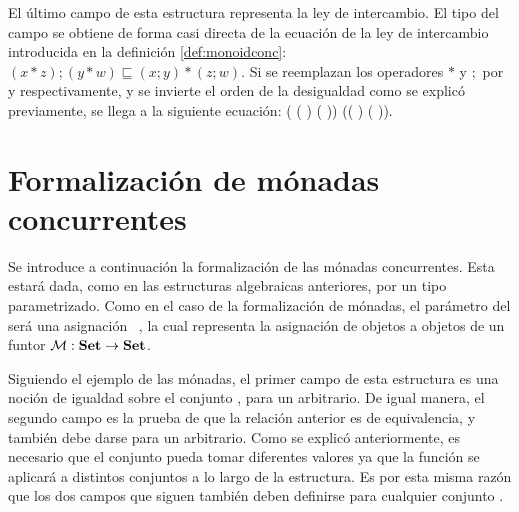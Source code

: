 El último campo de esta estructura representa la ley de intercambio. El tipo del campo  se obtiene de forma casi directa de la ecuación de la ley de intercambio introducida en la definición \ref{def:monoidconc}: $(x * z) ; (y * w) \sqsubseteq (x ; y) * (z ; w)$. Si se reemplazan los operadores $*$ y $;$ por  y  respectivamente, y se invierte el orden de la desigualdad como se explicó previamente, se llega a la siguiente ecuación: ( (  ) (  ))  (( )  ( )).

\section{Formalización de mónadas concurrentes}\label{form:monconc}

Se introduce a continuación la formalización de las mónadas concurrentes. Esta estará dada, como en las estructuras algebraicas anteriores, por un tipo  parametrizado. Como en el caso de la formalización de mónadas, el parámetro del   será una asignación \hbox{ \AgdaSymbol{:}  \AgdaSymbol{$\rightarrow$} }, la cual representa la asignación de objetos a objetos de un funtor $\mathcal{M} : \text{\bf Set} \rightarrow \text{\bf Set}$.


Siguiendo el ejemplo de las mónadas, el primer campo de esta estructura es una noción de igualdad sobre el conjunto , para un  arbitrario. De igual manera, el segundo campo es la prueba de que la relación anterior es de equivalencia, y también debe darse para un  arbitrario. Como se explicó anteriormente, es necesario que el conjunto  pueda tomar diferentes valores ya que la función  se aplicará a distintos conjuntos a lo largo de la estructura. Es por esta misma razón que los dos campos que siguen también deben definirse para cualquier conjunto . 

